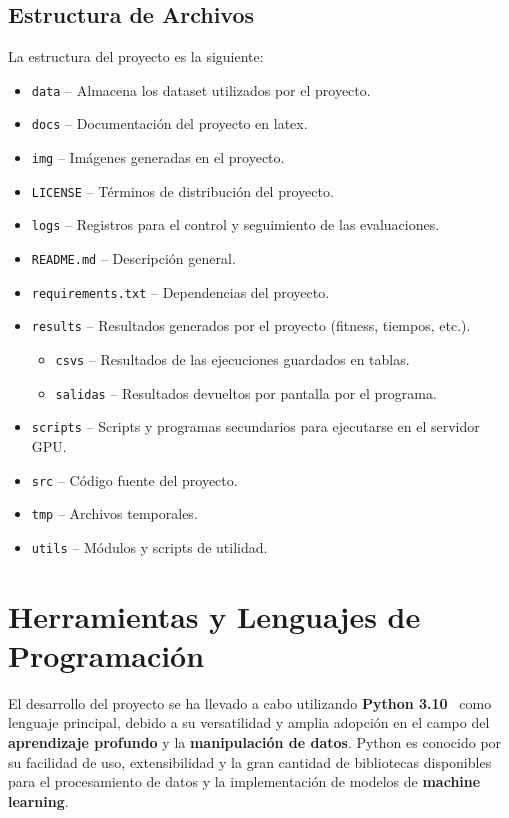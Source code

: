 \subsection{Estructura de Archivos}\label{subsec:estructura-de-archivos}
La estructura del proyecto es la siguiente:
\begin{itemize}
      \item \texttt{data} -- Almacena los dataset utilizados por el proyecto.
      \item \texttt{docs} -- Documentación del proyecto en latex.
      \item \texttt{img} -- Imágenes generadas en el proyecto.
      \item \texttt{LICENSE} -- Términos de distribución del proyecto.
      \item \texttt{logs} -- Registros para el control y seguimiento de las evaluaciones.
      \item \texttt{README.md} -- Descripción general.
      \item \texttt{requirements.txt} -- Dependencias del proyecto.
      \item \texttt{results} -- Resultados generados por el proyecto (fitness, tiempos, etc.).
            \begin{itemize}
                  \item \texttt{csvs} -- Resultados de las ejecuciones guardados en tablas.
                  \item \texttt{salidas} -- Resultados devueltos por pantalla por el programa.
            \end{itemize}
      \item \texttt{scripts} -- Scripts y programas secundarios para ejecutarse en el servidor GPU\@.
      \item \texttt{src} -- Código fuente del proyecto.
      \item \texttt{tmp} -- Archivos temporales.
      \item \texttt{utils} -- Módulos y scripts de utilidad.
\end{itemize}

\section{Herramientas y Lenguajes de Programación}\label{sec:herramientas-y-lenguajes-de-programacion}
El desarrollo del proyecto se ha llevado a cabo utilizando \textbf{Python 3.10}~\cite{vanderplas_python_2016} como
lenguaje principal, debido a su versatilidad y amplia adopción en el campo del \textbf{aprendizaje profundo} y la
\textbf{manipulación de datos}.
Python es conocido por su facilidad de uso, extensibilidad y la gran cantidad de bibliotecas disponibles para el
procesamiento de datos y la implementación de modelos de \textbf{machine learning}.


